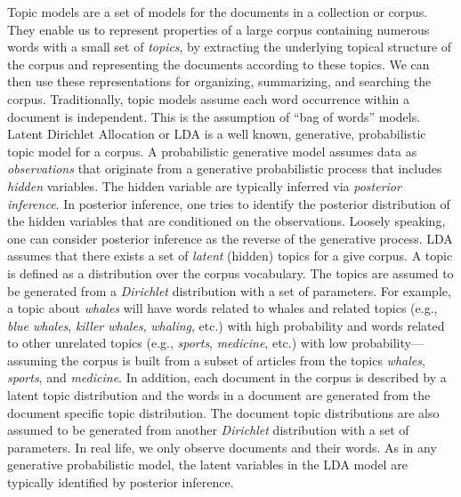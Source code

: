 \documentclass[letterpaper]{article}
\begin{document}
Topic models are a set of models for the documents in a collection 
or corpus. They enable us to represent properties of a large 
corpus containing numerous words with a small set of \textsl{topics}, 
by extracting the underlying topical structure of the corpus and 
representing the documents according to these topics. We can then 
use these representations for organizing, summarizing, and searching 
the corpus. Traditionally, topic models assume each word occurrence 
within a document is independent. This is the assumption of ``bag of 
words'' models. Latent Dirichlet Allocation or LDA 
\cite{Blei2003} is a well known, generative, probabilistic   
topic model for a corpus. A probabilistic generative model assumes 
data as \textsl{observations} that originate from a generative 
probabilistic process that includes \textsl{hidden} variables. The 
hidden variable are typically inferred via \textsl{posterior 
inference}. In posterior inference, one tries to identify the posterior 
distribution of the hidden variables that are conditioned on the observations. 
Loosely speaking, one can consider posterior inference as the 
reverse of the generative process. LDA assumes 
that there exists a set of \textsl{latent} (hidden) topics for a 
give corpus. A topic is defined as a distribution over the corpus 
vocabulary. The topics are assumed to be generated from a 
\textsl{Dirichlet} distribution with a set of parameters. For 
example, a topic about \textit{whales} will have words related to 
whales and related topics (e.g., \textit{blue whales}, \textit{killer whales}, 
\textit{whaling}, etc.) with high probability and words related to 
other unrelated topics (e.g., \textit{sports}, \textit{medicine}, 
etc.) with low probability---assuming the corpus is built from a 
subset of articles from the topics \textit{whales}, \textit{sports}, and 
\textit{medicine}. In addition, each document in the corpus is 
described by a latent topic distribution and the words in a document 
are generated from the document specific topic distribution. The 
document topic distributions 
are also assumed to be generated from another \textsl{Dirichlet} 
distribution with a set of parameters. In real life, we only observe 
documents and their words. As in any generative probabilistic model, 
the latent variables in the LDA model are typically identified by 
posterior inference. 
\end{document}
